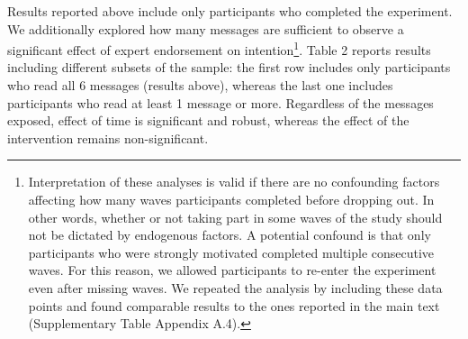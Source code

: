 \documentclass[authordate, empirical]{jote-new-article}
\begin{document}
	Results reported above include only participants who completed the experiment. We additionally explored how many messages are sufficient to observe a significant effect of expert endorsement on intention\footnote{ Interpretation of these analyses is valid if there are no confounding factors affecting how many waves participants completed before dropping out. In other words, whether or not taking part in some waves of the study should not be dictated by endogenous factors. A potential confound is that only participants who were strongly motivated completed multiple consecutive waves. For this reason, we allowed participants to re-enter the experiment even after missing waves. We repeated the analysis by including these data points and found comparable results to the ones reported in the main text (Supplementary Table Appendix A.4).}. Table 2 reports results including different subsets of the sample: the first row includes only participants who read all 6 messages (results above), whereas the last one includes participants who read at least 1 message or more. Regardless of the messages exposed, effect of time is significant and robust, whereas the effect of the intervention remains non-significant.
\end{document}
